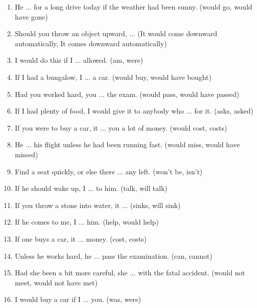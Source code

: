 \documentclass[12pt]{article}
\begin{document}
\begin{enumerate}
    \item He ... for a long drive today if the weather had been sunny. \hfill (would go, would have gone)

    \item Should you throw an object upward, ... \hfill (It would come downward automatically, It comes downward automatically)

    \item I would do this if I ... allowed. \hfill (am, were)

    \item If I had a bungalow, I ... a car. \hfill (would buy, would have bought)

    \item Had you worked hard, you ... the exam. \hfill (would pass, would have passed)

    \item If I had plenty of food, I would give it to anybody who ... for it. \hfill (asks, asked)

    \item If you were to buy a car, it ... you a lot of money. \hfill (would cost, costs)

    \item He ... his flight unless he had been running fast. \hfill (would miss, would have missed)

    \item Find a seat quickly, or else there ... any left. \hfill (won't be, isn't)

    \item If he should wake up, I ... to him. \hfill (talk, will talk)

    \item If you throw a stone into water, it ... \hfill (sinks, will sink)

    \item If he comes to me, I ... him. \hfill (help, would help)

    \item If one buys a car, it ... money. \hfill (cost, costs)

    \item Unless he works hard, he ... pass the examination. \hfill (can, cannot)

    \item Had she been a bit more careful, she ... with the fatal accident. \hfill (would not meet, would not have met)

    \item I would buy a car if I ... you. \hfill (was, were)


\end{enumerate}
\end{document}
